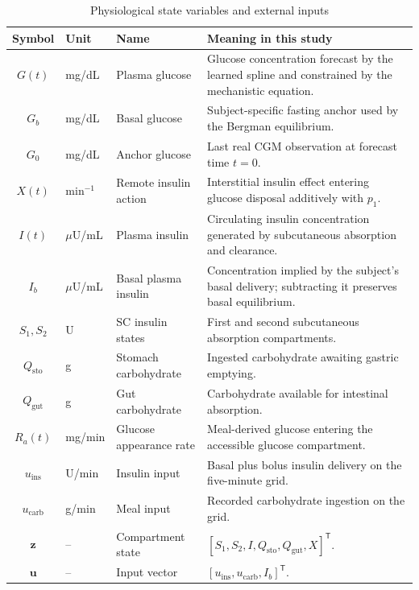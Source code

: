 \documentclass[10pt]{article}
\begin{document}
\begin{table}[h!]
\centering
\caption{Physiological state variables and external inputs}
\label{tab:states}
\footnotesize
\begin{tabular}{clp{5cm}p{7cm}}
\toprule
Symbol & Unit & Name & Meaning in this study \\
\midrule
$G(t)$ & mg/dL & Plasma glucose & Glucose concentration forecast by the learned spline and constrained by the mechanistic equation. \\
$G_b$ & mg/dL & Basal glucose & Subject-specific fasting anchor used by the Bergman equilibrium. \\
$G_0$ & mg/dL & Anchor glucose & Last real CGM observation at forecast time $t=0$. \\
$X(t)$ & min$^{-1}$ & Remote insulin action & Interstitial insulin effect entering glucose disposal additively with $p_1$. \\
$I(t)$ & $\mu$U/mL & Plasma insulin & Circulating insulin concentration generated by subcutaneous absorption and clearance. \\
$I_b$ & $\mu$U/mL & Basal plasma insulin & Concentration implied by the subject's basal delivery; subtracting it preserves basal equilibrium. \\
$S_1, S_2$ & U & SC insulin states & First and second subcutaneous absorption compartments. \\
$Q_{\text{sto}}$ & g & Stomach carbohydrate & Ingested carbohydrate awaiting gastric emptying. \\
$Q_{\text{gut}}$ & g & Gut carbohydrate & Carbohydrate available for intestinal absorption. \\
$R_a(t)$ & mg/min & Glucose appearance rate & Meal-derived glucose entering the accessible glucose compartment. \\
$u_{\text{ins}}$ & U/min & Insulin input & Basal plus bolus insulin delivery on the five-minute grid. \\
$u_{\text{carb}}$ & g/min & Meal input & Recorded carbohydrate ingestion on the grid. \\
$\mathbf{z}$ & -- & Compartment state & ${[S_1, S_2, I, Q_{\text{sto}}, Q_{\text{gut}}, X]}^{\mathsf T}$. \\
$\mathbf{u}$ & -- & Input vector & ${[u_{\text{ins}}, u_{\text{carb}}, I_b]}^{\mathsf T}$. \\
\bottomrule
\end{tabular}
\end{table}
\end{document}
